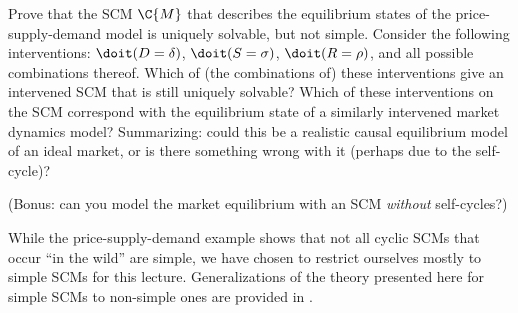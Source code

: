 \begin{Exc}
  Prove that the SCM $\C{M}$ that describes the equilibrium states of the price-supply-demand model is uniquely solvable, but not simple. 
  Consider the following interventions: $\doit(D=\delta)$, $\doit(S=\sigma)$, $\doit(R=\rho)$, and all possible combinations thereof. Which of (the combinations of) these interventions give an intervened SCM that is still uniquely solvable?
  Which of these interventions on the SCM correspond with the equilibrium state of a similarly intervened market dynamics model?
  Summarizing: could this be a realistic causal equilibrium model of an ideal market, or is there something wrong with it (perhaps due to the self-cycle)?

  (Bonus: can you model the market equilibrium with an SCM \emph{without} self-cycles?)
\end{Exc}

While the price-supply-demand example shows that not all cyclic SCMs that occur ``in the wild'' are simple, we have chosen
to restrict ourselves mostly to simple SCMs for this lecture. Generalizations of the theory presented here for simple SCMs 
to non-simple ones are provided in \cite{BFPM21}.
